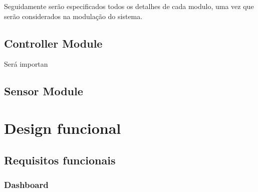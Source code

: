 Seguidamente serão especificados todos os detalhes de cada modulo, uma vez que serão considerados na modulação do sistema. 

\subsection{Controller Module}

Será importan


\subsection{Sensor Module}


\newpage

\section{Design funcional}






\subsection{Requisitos funcionais}







\subsubsection{Dashboard}


